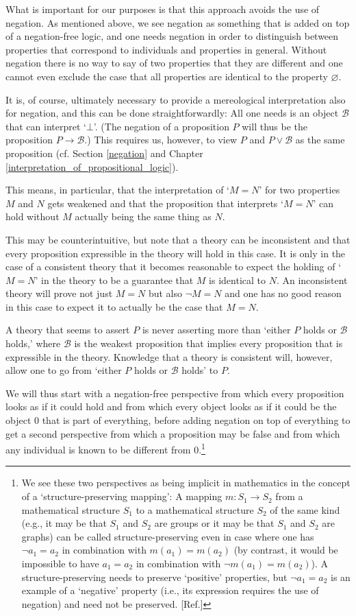 \documentclass[12pt]{book}
\begin{document}
What is important for our purposes is that this approach avoids the use of negation. As mentioned above, we see negation as something that is added on top of a negation-free logic, and one needs negation in order to distinguish between properties that correspond to individuals and properties in general. Without negation there is no way to say of two properties that they are different and one cannot even exclude the case that all properties are identical to the property $\varnothing$.

It is, of course, ultimately necessary to provide a mereological interpretation also for negation, and this can be done straightforwardly: All one needs is an object $\mathcal{B}$ that can interpret ‘$\bot$’. (The negation of a proposition $P$ will thus be the proposition $P \rightarrow \mathcal{B}$.) This requires us, however, to view $P$ and $P \vee \mathcal{B}$ as the same proposition (cf. Section \ref{negation} and Chapter \ref{interpretation_of_propositional_logic}).

This means, in particular, that the interpretation of ‘$M = N$’ for two properties $M$ and $N$ gets weakened and that the proposition that interprets ‘$M = N$’ can hold without $M$ actually being the same thing as $N$.

This may be counterintuitive, but note that a theory can be inconsistent and that every proposition expressible in the theory will hold in this case. It is only in the case of a consistent theory that it becomes reasonable to expect the holding of ‘$M = N$’ in the theory to be a guarantee that $M$ is identical to $N$. An inconsistent theory will prove not just $M=N$ but also $\neg M=N$ and one has no good reason in this case to expect it to actually be the case that $M=N$.

A theory that seems to assert $P$ is never asserting more than ‘either $P$ holds or $\mathcal{B}$ holds,’ where $\mathcal{B}$ is the weakest proposition that implies every proposition that is expressible in the theory. Knowledge that a theory is consistent will, however, allow one to go from ‘either $P$ holds or $\mathcal{B}$ holds’ to $P$.

We will thus start with a negation-free perspective from which every proposition looks as if it could hold and from which every object looks as if it could be the object $0$ that is part of everything, before adding negation on top of everything to get a second perspective from which a proposition may be false and from which any individual is known to be different from $0$.\footnote{We see these two perspectives as being implicit in mathematics in the concept of a `structure-preserving mapping': A mapping $m: S_1 \rightarrow S_2$ from a mathematical structure $S_1$ to a mathematical structure $S_2$ of the same kind (e.g., it may be that $S_1$ and $S_2$ are groups or it may be that $S_1$ and $S_2$ are graphs) can be called structure-preserving even in case where one has $\neg a_1 = a_2$ in combination with $m(a_1) = m(a_2)$ (by contrast, it would be impossible to have $a_1 = a_2$ in combination with $\neg m(a_1) = m(a_2)$). A structure-preserving needs to preserve `positive' properties, but $\neg a_1 = a_2$ is an example of a `negative' property (i.e., its expression requires the use of negation) and need not be preserved. [Ref.]}
\end{document}
